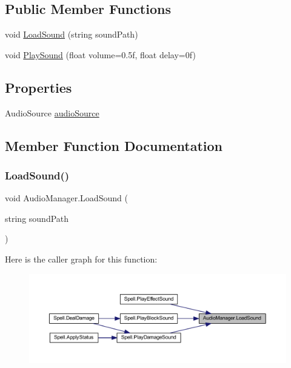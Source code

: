 \subsection*{Public Member Functions}
\begin{DoxyCompactItemize}
\item 
void \mbox{\hyperlink{class_audio_manager_a1520faf231d9b58d63a794f6b8040b99}{Load\+Sound}} (string sound\+Path)
\item 
void \mbox{\hyperlink{class_audio_manager_ac0f0dc189806848c224581b363b87396}{Play\+Sound}} (float volume=0.\+5f, float delay=0f)
\end{DoxyCompactItemize}
\subsection*{Properties}
\begin{DoxyCompactItemize}
\item 
Audio\+Source \mbox{\hyperlink{class_audio_manager_a0c2aea6ea779d69228564aca9476ea80}{audio\+Source}}
\end{DoxyCompactItemize}


\subsection{Member Function Documentation}
\mbox{\label{class_audio_manager_a1520faf231d9b58d63a794f6b8040b99}} 
\subsubsection{\texorpdfstring{LoadSound()}{LoadSound()}}
{\footnotesize\ttfamily void Audio\+Manager.\+Load\+Sound (\begin{DoxyParamCaption}\item[{string}]{sound\+Path }\end{DoxyParamCaption})}

Here is the caller graph for this function\+:
\nopagebreak
\begin{figure}[H]
\begin{center}
\leavevmode
\includegraphics[width=350pt]{class_audio_manager_a1520faf231d9b58d63a794f6b8040b99_icgraph}
\end{center}
\end{figure}
\mbox{\label{class_audio_manager_ac0f0dc189806848c224581b363b87396}} 
